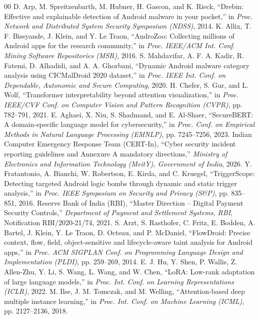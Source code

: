 \documentclass[conference]{IEEEtran}
\begin{document}
\begin{thebibliography}{00}
 D. Arp, M. Spreitzenbarth, M. Hubner, H. Gascon, and K. Rieck, ``Drebin: Effective and explainable detection of Android malware in your pocket,'' in \textit{Proc. Network and Distributed System Security Symposium (NDSS)}, 2014.
 K. Allix, T. F. Bissyande, J. Klein, and Y. Le Traon, ``AndroZoo: Collecting millions of Android apps for the research community,'' in \textit{Proc. IEEE/ACM Int. Conf. Mining Software Repositories (MSR)}, 2016.
 S. Mahdavifar, A. F. A. Kadir, R. Fatemi, D. Alhadidi, and A. A. Ghorbani, ``Dynamic Android malware category analysis using CICMalDroid 2020 dataset,'' in \textit{Proc. IEEE Int. Conf. on Dependable, Autonomic and Secure Computing}, 2020.
 H. Chefer, S. Gur, and L. Wolf, ``Transformer interpretability beyond attention visualization,'' in \textit{Proc. IEEE/CVF Conf. on Computer Vision and Pattern Recognition (CVPR)}, pp. 782--791, 2021.
 E. Aghaei, X. Niu, S. Shadmand, and E. Al-Shaer, ``SecureBERT: A domain-specific language model for cybersecurity,'' in \textit{Proc. Conf. on Empirical Methods in Natural Language Processing (EMNLP)}, pp. 7245--7256, 2023.
 Indian Computer Emergency Response Team (CERT-In), ``Cyber security incident reporting guidelines and Annexure A mandatory directions,'' \textit{Ministry of Electronics and Information Technology (MeitY), Government of India}, 2026.
 Y. Fratantonio, A. Bianchi, W. Robertson, E. Kirda, and C. Kruegel, ``TriggerScope: Detecting targeted Android logic bombs through dynamic and static trigger analysis,'' in \textit{Proc. IEEE Symposium on Security and Privacy (S\&P)}, pp. 835--851, 2016.
 Reserve Bank of India (RBI), ``Master Direction -- Digital Payment Security Controls,'' \textit{Department of Payment and Settlement Systems, RBI}, Notification RBI/2020-21/74, 2021.
 S. Arzt, S. Rasthofer, C. Fritz, E. Bodden, A. Bartel, J. Klein, Y. Le Traon, D. Octeau, and P. McDaniel, ``FlowDroid: Precise context, flow, field, object-sensitive and lifecycle-aware taint analysis for Android apps,'' in \textit{Proc. ACM SIGPLAN Conf. on Programming Language Design and Implementation (PLDI)}, pp. 259--269, 2014.
 E. J. Hu, Y. Shen, P. Wallis, Z. Allen-Zhu, Y. Li, S. Wang, L. Wang, and W. Chen, ``LoRA: Low-rank adaptation of large language models,'' in \textit{Proc. Int. Conf. on Learning Representations (ICLR)}, 2022.
 M. Ilse, J. M. Tomczak, and M. Welling, ``Attention-based deep multiple instance learning,'' in \textit{Proc. Int. Conf. on Machine Learning (ICML)}, pp. 2127--2136, 2018.

\end{thebibliography}
\end{document}
